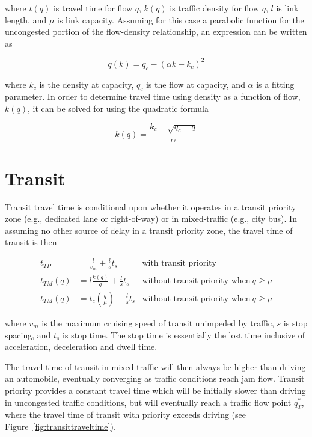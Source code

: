 \documentclass{article}
\begin{document}
\noindent where $t(q)$ is travel time for flow $q$, $k(q)$ is traffic density for flow $q$, $l$ is link length, and $\mu$ is link capacity. Assuming for this case a parabolic function for the uncongested portion of the flow-density relationship, an expression can be written as

\begin{equation}
    q(k) = q_c - (\alpha k - k_c)^2
\end{equation}

\noindent where $k_c$ is the density at capacity, $q_c$ is the flow at capacity, and $\alpha$ is a fitting parameter. In order to determine travel time using density as a function of flow, $k(q)$, it can be solved for using the quadratic formula

\begin{equation}
    k(q) = \frac{k_c - \sqrt{q_c - q}}{\alpha}
    \label{eq:densityparabolic}
\end{equation}


\section{Transit}

Transit travel time is conditional upon whether it operates in a transit priority zone (e.g., dedicated lane or right-of-way) or in mixed-traffic (e.g., city bus). In assuming no other source of delay in a transit priority zone, the travel time of transit is then

\begin{subequations}
\begin{align}
    t_{TP} & = \frac{l}{v_{m}} + \frac{l}{s}t_s  & \text{with transit priority} \\
    t_{TM}(q) & = l\frac{k(q)}{q} + \frac{l}{s}t_s  & \text{without transit priority when}~q \geq \mu\\
    t_{TM}(q) & = t_c \left(\frac{q}{\mu}\right) + \frac{l}{s}t_s & \text{without transit priority when}~q \geq \mu
\end{align}
\end{subequations}

\noindent where $v_m$ is the maximum cruising speed of transit unimpeded by traffic, $s$ is stop spacing, and $t_s$ is stop time. The stop time is essentially the lost time inclusive of acceleration, deceleration and dwell time.

The travel time of transit in mixed-traffic will then always be higher than driving an automobile, eventually converging as traffic conditions reach jam flow. Transit priority provides a constant travel time which will be initially slower than driving in uncongested traffic conditions, but will eventually reach a traffic flow point $q^*_T$, where the travel time of transit with priority exceeds driving (see Figure~\ref{fig:transittraveltime}).
\end{document}
